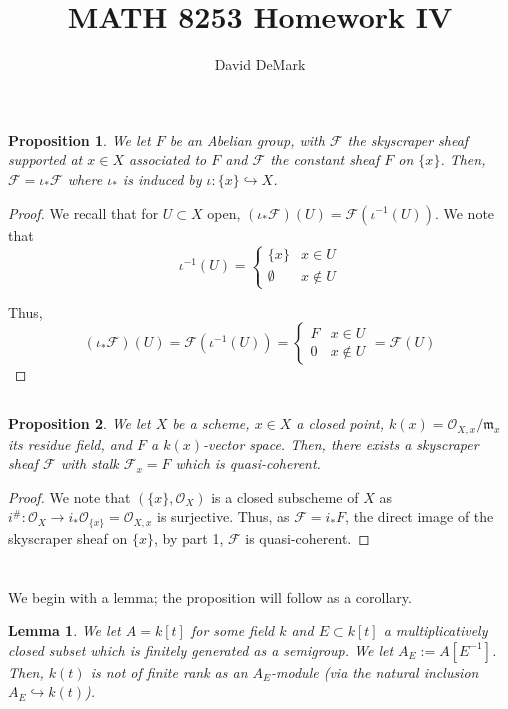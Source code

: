 \documentclass[english,letter,doublesided]{article}
\title{MATH 8253 Homework IV}
\author{David DeMark}
\date{\due}
\newcommand{\OO}{\mathcal{O}}
\newcommand{\Fcal}{\mathcal{F}}
\newcommand{\fsc}{\mathscr{F}}
\newcommand{\mfr}{\mathfrak{m}}
\newcommand{\prob}[1]{\setcounter{section}{#1-1}\section{}}
\newcommand{\prt}[1]{\setcounter{subsection}{#1-1}\subsection{}}
\newtheorem*{lemma*}{Lemma}
\newtheorem*{proposition*}{Proposition}
\theoremstyle{remark}
\theoremstyle{definition}
\begin{document}
\prob{1}\prt{1} \begin{proposition*}
	We let $F$ be an Abelian group, with $\fsc$ the skyscraper sheaf supported at $x\in X$ associated to $F$ and $\Fcal$ the constant sheaf $F$ on $\{x\}$. Then, $\fsc=\iota_*\Fcal$ where $\iota_*$ is induced by $\iota: \{x\}\hookrightarrow X$. 
\end{proposition*}
\begin{proof}
	We recall that for $U\subset X$ open, $(\iota_*\Fcal)(U)=\Fcal(\iota^{-1}(U))$. We note that \begin{equation*}
	\iota^{-1}(U)=\begin{cases}
	\{x\}&x\in U\\
	\emptyset &x\notin U
	\end{cases}\end{equation*}

Thus,
\begin{equation*}
(\iota_*\Fcal)(U)=\Fcal(\iota^{-1}(U))=\begin{cases}
F&x\in U\\
0 &x\notin U
\end{cases}=\fsc(U)\end{equation*}
\end{proof}
\prt{2}\begin{proposition*}
	We let $X$ be a scheme, $x\in X$ a closed point, $k(x)=\OO_{X,x}/\mfr_x$ its residue field, and $F$ a $k(x)$-vector space. Then, there exists a skyscraper sheaf $\Fcal$ with stalk $\Fcal_x=F$ which is quasi-coherent.
\end{proposition*}
\begin{proof}
	We note that $(\{x\},\OO_X)$ is a closed subscheme of $X$ as $i^\#:\OO_{X}\to i_*\OO_{\{x\}}=\OO_{X,x}$ is surjective. Thus, as $\Fcal=i_*F$, the direct image of the skyscraper sheaf on $\{x\}$, by part 1, $\Fcal$ is quasi-coherent.   
\end{proof}
%
%
%
\prob{2}
We begin with a lemma; the proposition will follow as a corollary.
\begin{lemma*}
	We let $A=k[t]$ for some field $k$ and $E\subset k[t]$ a multiplicatively closed subset which is finitely generated as a semigroup. We let $A_E:=A[E^{-1}]$. Then, $k(t)$ is not of finite rank as an $A_E$-module (via the natural inclusion $A_E\hookrightarrow k(t)$).
\end{lemma*}
\end{document}
